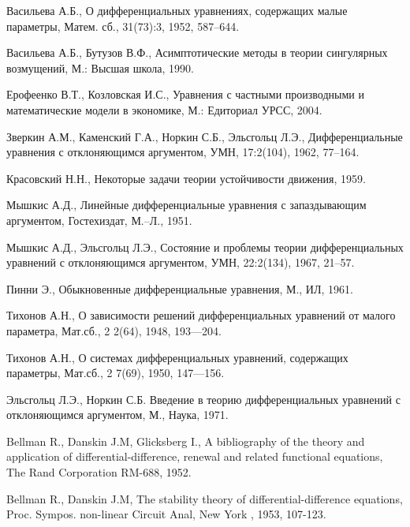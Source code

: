 \begin{thebibliography}{99} %



Васильева А.Б., О дифференциальных уравнениях, содержащих малые параметры, Матем. сб., 31(73):3, 1952, 587–644.

Васильева А.Б., Бутузов В.Ф., Асимптотические методы в теории сингулярных возмущений, М.: Высшая школа, 1990.

Ерофеенко В.Т., Козловская И.С., Уравнения с частными производными и математические модели в экономике, М.: Едиториал УРСС, 2004.

Зверкин А.М., Каменский Г.А., Норкин С.Б., Эльсгольц Л.Э., Дифференциальные уравнения с отклоняющимся аргументом, УМН, 17:2(104), 1962, 77–164.

Красовский Н.Н., Некоторые задачи теории устойчивости движения, 1959.

Мышкис А.Д., Линейные дифференциальные уравнения с запаздывающим аргументом, Гостехиздат, М.–Л., 1951.

Мышкис А.Д., Эльсгольц Л.Э., Состояние и проблемы теории дифференциальных уравнений с отклоняющимся аргументом, УМН, 22:2(134), 1967, 21–57.

Пинни Э., Обыкновенные дифференциальные уравнения, М., ИЛ, 1961.

Тихонов А.Н., О зависимости решений дифференциальных уравнений от малого параметра, Мат.сб., 2 2(64), 1948, 193—204.

Тихонов А.Н., О системах дифференциальных уравнений, содержащих параметры, Мат.сб., 2 7(69), 1950, 147—156.

Эльсгольц Л.Э., Норкин С.Б. Введение в теорию дифференциальных уравнений с отклоняющимся аргументом, М., Наука, 1971.


Bellman R., Danskin J.M, Glicksberg I., A bibliography of the theory and application of differential-difference, renewal and related functional equations, The Rand Corporation RM-688, 1952.

Bellman R., Danskin J.M, The stability theory of differential-difference equations, Proc. Sympos. non-linear Circuit Anal, New York , 1953, 107-123.


\end{thebibliography}
